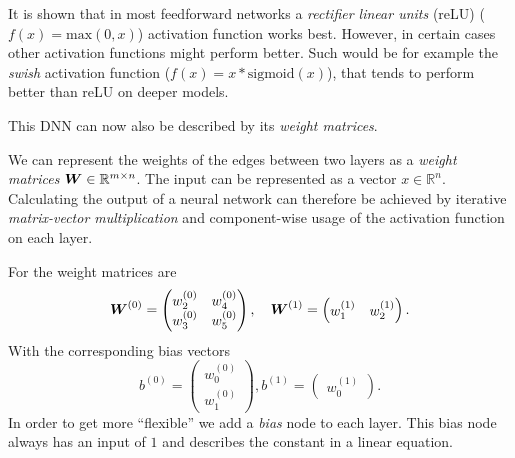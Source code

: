 It is shown that in most feedforward networks a \emph{rectifier linear units} (reLU) (\(f(x) = \text{max}(0, x)\)) activation function works best. \cite{Nair-Hinton} \cite{inproceedings}
However, in certain cases other activation functions might perform better.
Such would be for example the \emph{swish} activation function (\(f(x) = x * \text{sigmoid}(x)\)), that tends to perform better than reLU on deeper models. \cite{DBLP:journals/corr/abs-1710-05941}



This DNN  can now also be described by its \emph{weight matrices}. 

We can represent the weights of the edges between two layers as a \emph{weight matrices} \(\boldsymbol{W} \in \mathbb{R}^{m \times n}\).
The input can be represented as a vector \({x \in \mathbb{R}^n}\).
Calculating the output of a neural network can therefore be achieved by iterative \emph{matrix-vector multiplication} and component-wise usage of the activation function on each layer.

For  the weight matrices are
\begin{equation}
    \boldsymbol{W}^{(0)} =
    \begin{pmatrix}
        w_{2}^{(0)} & w_{4}^{(0)} \\
        w_{3}^{(0)} & w_{5}^{(0)}
    \end{pmatrix}, \quad
    \boldsymbol{W}^{(1)} = 
    \begin{pmatrix}
        w_{1}^{(1)} & w_{2}^{(1)}
    \end{pmatrix}.
\end{equation}
With the corresponding bias vectors
\begin{equation}
    b^{(0)} =
    \begin{pmatrix}
        w_{0}^{(0)} \\
        w_{1}^{(0)}
    \end{pmatrix},
    b^{(1)} =
    \begin{pmatrix}
        w_{0}^{(1)}
    \end{pmatrix}.
\end{equation}
In order to get more \enquote{flexible} we add a \emph{bias} node to each layer.
This bias node always has an input of \(1\) and describes the constant in a linear equation.

